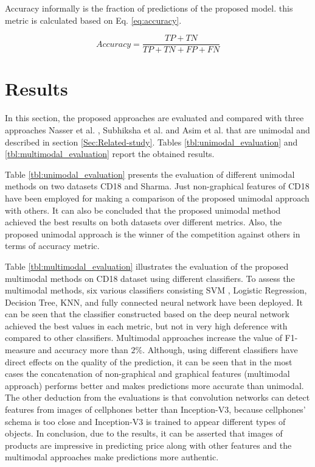 \documentclass{svjour3}                     \smartqed  \usepackage{graphicx}
\begin{document}
Accuracy informally is the fraction of predictions of the proposed model. this metric is calculated based on Eq. \ref{eq:accuracy}.

\begin{equation}
    Accuracy = \frac{TP + TN}{TP + TN + FP + FN}
    \label{eq:accuracy}
\end{equation}
\section{Results} \label{Subsec:Evaluation}
In this section, the proposed approaches are evaluated and compared with three approaches Nasser et al. \cite{Nasser2019}, Subhiksha et al. \cite{Subhiksha2020} and  Asim et al. \cite{Asim2018} that are unimodal and described in section \ref{Sec:Related-study}. Tables \ref{tbl:unimodal_evaluation} and \ref{tbl:multimodal_evaluation} report the obtained results.


Table \ref{tbl:unimodal_evaluation} presents the evaluation of different unimodal methods on two datasets CD18 and Sharma. Just non-graphical features of CD18 have been employed for making a comparison of the proposed unimodal approach with others. It can also be concluded that the proposed unimodal method achieved the best results on both datasets over different metrics. Also, the proposed unimodal approach is the winner of the competition against others in terms of accuracy metric.

Table \ref{tbl:multimodal_evaluation} illustrates the evaluation of the proposed multimodal methods on CD18 dataset using different classifiers. To assess the multimodal methods, six various classifiers consisting SVM \cite{Shi2011}, Logistic Regression, Decision Tree, KNN, and fully connected neural network have been deployed. It can be seen that the classifier constructed based on the deep neural network achieved the best values in each metric, but not in very high deference with compared to other classifiers. Multimodal approaches increase the value of F1-measure and accuracy more than $2\%$.  
Although, using different classifiers have direct effects on the quality of the prediction, it can be seen that in the most cases the concatenation of non-graphical and graphical features (multimodal approach) performs better and makes predictions more accurate than unimodal. The other deduction from the evaluations is that convolution networks can detect features from images of cellphones better than Inception-V3, because cellphones' schema is too close and Inception-V3 is trained to appear different types of objects. In conclusion, due to the results, it can be asserted that images of products are impressive in predicting price along with other features and the multimodal approaches make predictions more authentic.
\end{document}
